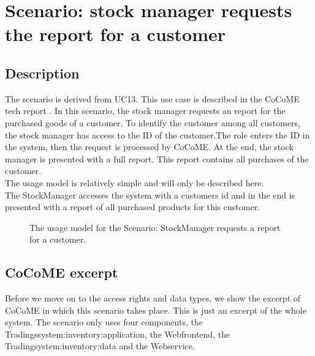 \section{Scenario: stock manager requests the report for a customer}
\label{descripScn_casestudy_scn1} 
\subsection{Description}
The scenario is derived from UC13. This use case is described in the CoCoME tech report \cite{CoCoMETechReport}. In this scenario, the stock manager requests an report for the purchased goods of a customer. To identify the customer among all customers, the stock manager has access to the ID of the customer.The role enters the ID in the system, then the request is processed by CoCoME. At the end, the stock manager is presented with a full report. This report contains all purchases of the customer.\\
The usage model is relatively simple and will only be described here.\\ The StockManager accesses the system with a customers id and in the end is presented with a report of all purchased products for this customer.

\begin{figure}
\label{usage_UC13}
\caption{The usage model for the Scenario: StockManager requests a report for a customer.}
\end{figure}
\subsection{CoCoME excerpt} 
Before we move on to the access rights and data types, we show the excerpt of CoCoME in which this scenario takes place. This is just an excerpt of the whole system. The scenario only uses four components, the Tradingssystem:inventory:application, the Webfrontend, the Tradingsystem:inventory:data and the Webservice. 

